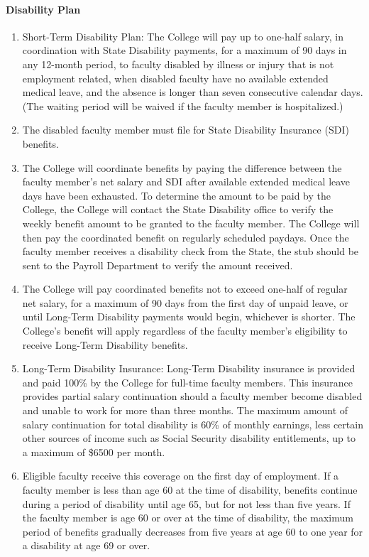 \documentclass[letterpaper, 11pt]{article}
\begin{document}
			\paragraph{Disability Plan}
				\begin{enumerate}[label=\alph*)]
					\item{Short-Term Disability Plan:  The College will pay up to one-half salary, in coordination with State Disability payments, for a maximum of 90 days in any 12-month period, to faculty disabled by illness or injury that is not employment related, when disabled faculty have no available extended medical leave, and the absence is longer than seven consecutive calendar days.  (The waiting period will be waived if the faculty member is hospitalized.)}
					\item{The disabled faculty member must file for State Disability Insurance (SDI) benefits.}
					\item{The College will coordinate benefits by paying the difference between the faculty member's net salary and SDI after available extended medical leave days have been exhausted.  To determine the amount to be paid by the College, the College will contact the State Disability office to verify the weekly benefit amount to be granted to the faculty member.  The College will then pay the coordinated benefit on regularly scheduled paydays.  Once the faculty member receives a disability check from the State, the stub should be sent to the Payroll Department to verify the amount received.}
					\item{The College will pay coordinated benefits not to exceed one-half of regular net salary, for a maximum of 90 days from the first day of unpaid leave, or until Long-Term Disability payments would begin, whichever is shorter.  The College's benefit will apply regardless of the faculty member's eligibility to receive Long-Term Disability benefits.}
					\item{Long-Term Disability Insurance:  Long-Term Disability insurance is provided
						and paid 100\% by the College for full-time faculty members.  This insurance
						provides partial salary continuation should a faculty member become disabled and
						unable to work for more than three months.  The maximum amount of salary
						continuation for total disability is 60\% of monthly earnings, less certain other
						sources of income such as Social Security disability entitlements, up to a
						maximum of \$6500 per month.}
					\item{Eligible faculty receive this coverage on the first day of employment.  If a faculty member is less than age 60 at the time of disability, benefits continue during a period of disability until age 65, but for not less than five years.  If the faculty member is age 60 or over at the time of disability, the maximum period of benefits gradually decreases from five years at age 60 to one year for a disability at age 69 or over.}

\end{enumerate}
\end{document}
